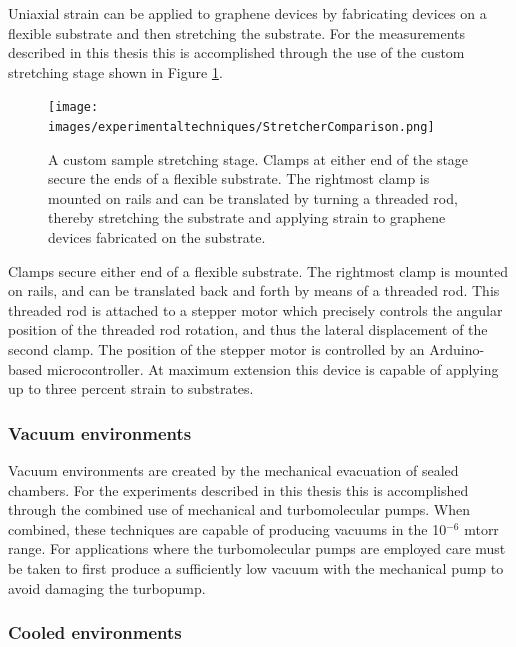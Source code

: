 \documentclass[edeposit,fullpage,draftthesis]{uiucthesis2009}
\begin{document}
        Uniaxial strain can be applied to graphene devices by fabricating devices on a flexible substrate
        and then stretching the substrate. For the measurements described in this thesis this 
        is accomplished through the use of the custom stretching stage shown in Figure \ref{fig:stretcher}.
        \begin{figure}
            \centering
            \texttt{[image: images/experimentaltechniques/StretcherComparison.png]}
            \caption[Custom sample stretching stage]{
                A custom sample stretching stage. Clamps at either end of the stage secure the ends
                of a flexible substrate. The rightmost clamp is mounted on rails and can be translated
                by turning a threaded rod, thereby stretching the substrate and applying strain
                to graphene devices fabricated on the substrate.
                }
            \label{fig:stretcher}
        \end{figure}
        Clamps secure either end of a flexible substrate. The rightmost clamp is mounted on rails,
        and can be translated back and forth by means of a threaded rod. This threaded rod is attached
        to a stepper motor which precisely controls the angular position of the threaded rod rotation,
        and thus the lateral displacement of the second clamp. The position of the stepper motor is
        controlled by an Arduino-based microcontroller.
        At maximum extension this device is capable of applying up to three percent strain to substrates. 
        
        \subsubsection*{Vacuum environments}
        
        Vacuum environments are created by the mechanical evacuation of sealed chambers. 
        For the experiments described in this thesis this is accomplished through the combined use
        of mechanical and turbomolecular pumps. 
        When combined, these techniques are capable of producing vacuums in the 10$^{-6}$ mtorr range.
        For applications where the turbomolecular pumps are employed care must be taken to first produce a sufficiently 
        low vacuum with the mechanical pump to avoid damaging the turbopump.
        
        \subsubsection*{Cooled environments}
        
\end{document}
